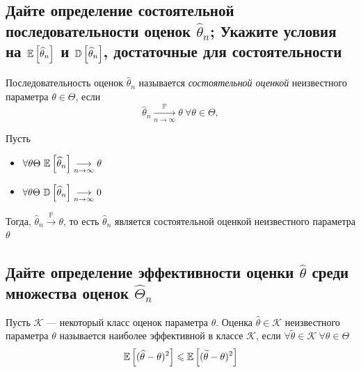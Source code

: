 \documentclass{article}
\begin{document}
\subsection{Дайте определение состоятельной последовательности оценок $\widehat{\theta}_n$; Укажите условия на $\mathbb{E}\left[\widehat{\theta}_n\right]$ и $\mathbb{D}\left[\widehat{\theta}_n\right]$, достаточные для состоятельности}
 Последовательность оценок $\hat{\theta}_n$ называется \textit{состоятельной оценкой} неизвестного параметра $\theta\in\Theta$, если
\begin{equation*}
    \hat{\theta}_n\underset{n\to\infty}{\overset{\mathbb{P}}{\longrightarrow}}\theta\ \forall \theta\in\Theta,
\end{equation*}

\theorem Пусть 
\begin{itemize}
    \item $\forall\theta\Theta\ \matwait{\widehat{\theta}_n}\underset{n\to\infty}{\longrightarrow}\theta$
    \item $\forall\theta\Theta\ \dispersia{\widehat{\theta}_n}\underset{n\to\infty}{\longrightarrow}0$
\end{itemize}
Тогда, $\widehat{\theta}_n\overset{\mathbb{P}}{\longrightarrow}\theta$, то есть $\widehat{\theta}_n$ является состоятельной оценкой  неизвестного параметра $\theta$




\subsection{Дайте определение эффективности оценки $\widehat{\theta}$ среди множества оценок $\widehat{\Theta}_n$}
 Пусть $\mathcal{K}$ — некоторый класс оценок параметра $\theta$. Оценка $\widehat{\theta}\in\mathcal{K}$ неизвестного параметра $\theta$ называется наиболее эффективной в классе $\mathcal{K}$, если $\forall\widetilde{\theta}\in\mathcal{K}\ \forall \theta\in\Theta$
\begin{equation*}
    \begin{aligned}
        \mathbb{E}\left[(\widehat{\theta}-\theta)^2\right]\leqslant\mathbb{E}\left[(\widetilde{\theta}-\theta)^2\right]
    \end{aligned}
\end{equation*}

\end{document}

